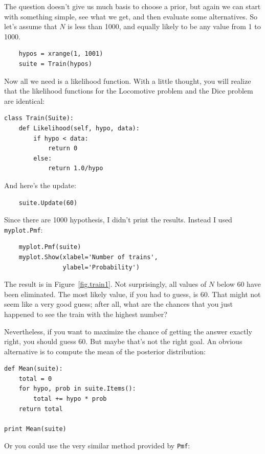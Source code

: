 \documentclass[12pt]{book}
\begin{document}
The question doesn't give us much basis to choose a prior, but
again we can start with something simple, see what we get, and
then evaluate some alternatives.  So let's assume that $N$ is less
than 1000, and equally likely to be any value from 1 to 1000.

\begin{verbatim}
    hypos = xrange(1, 1001)
    suite = Train(hypos)
\end{verbatim}

Now all we need is a likelihood function.  With a little thought,
you will realize that the likelihood functions for the Locomotive
problem and the Dice problem are identical:

\begin{verbatim}
class Train(Suite):
    def Likelihood(self, hypo, data):
        if hypo < data:
            return 0
        else:
            return 1.0/hypo
\end{verbatim}

And here's the update:

\begin{verbatim}
    suite.Update(60)
\end{verbatim}

Since there are 1000 hypothesis, I didn't print the results.
Instead I used {\tt myplot.Pmf}:

\begin{verbatim}
    myplot.Pmf(suite)
    myplot.Show(xlabel='Number of trains',
                ylabel='Probability')
\end{verbatim}

The result is in Figure~\ref{fig.train1}.  Not surprisingly, all
values of $N$ below 60 have been eliminated.  The most likely
value, if you had to guess, is 60.  That might not seem like
a very good guess; after all, what are the chances that you just
happened to see the train with the highest number?

Nevertheless, if you want to maximize the chance of getting
the answer exactly right, you should guess 60.  But maybe that's
not the right goal.  An obvious alternative is to compute the
mean of the posterior distribution:

\begin{verbatim}
def Mean(suite):
    total = 0
    for hypo, prob in suite.Items():
        total += hypo * prob
    return total

print Mean(suite)
\end{verbatim}

Or you could use the very similar method provided by {\tt Pmf}:
\end{document}
